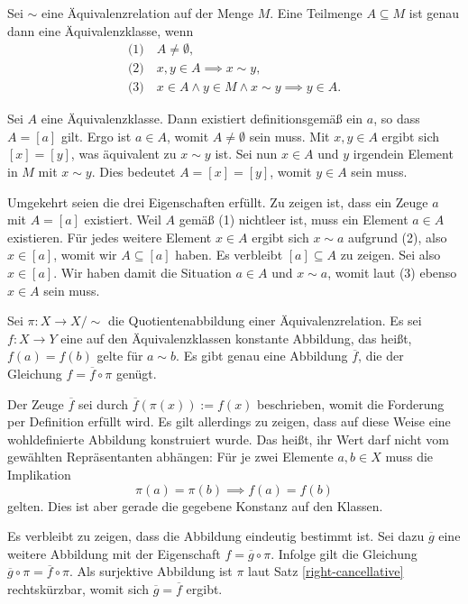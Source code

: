 \begin{Satz}\newlinefirst
Sei $\sim$ eine Äquivalenzrelation auf der Menge $M$. Eine
Teilmenge $A\subseteq M$ ist genau dann eine Äquivalenzklasse, wenn%
\begin{gather*}
\text{(1)}\quad A\ne\emptyset,\\
\text{(2)}\quad x,y\in A\implies x\sim y,\\
\text{(3)}\quad x\in A\land y\in M\land x\sim y\implies y\in A.
\end{gather*}
\end{Satz}
\begin{Beweis}
Sei $A$ eine Äquivalenzklasse. Dann existiert definitionsgemäß
ein $a$, so dass $A=[a]$ gilt. Ergo ist $a\in A$, womit
$A\ne\emptyset$ sein muss. Mit $x,y\in A$ ergibt sich $[x]=[y]$,
was äquivalent zu $x\sim y$ ist. Sei nun $x\in A$ und $y$ irgendein
Element in $M$ mit $x\sim y$. Dies bedeutet $A=[x]=[y]$, womit
$y\in A$ sein muss.

Umgekehrt seien die drei Eigenschaften erfüllt. Zu zeigen ist,
dass ein Zeuge $a$ mit $A=[a]$ existiert. Weil $A$ gemäß (1)
nichtleer ist, muss ein Element $a\in A$ existieren. Für jedes
weitere Element $x\in A$ ergibt sich $x\sim a$ aufgrund (2),
also $x\in [a]$, womit wir $A\subseteq [a]$ haben.
Es verbleibt $[a]\subseteq A$ zu zeigen. Sei also $x\in [a]$.
Wir haben damit die Situation $a\in A$ und $x\sim a$, womit
laut (3) ebenso $x\in A$ sein muss.\,\qedsymbol
\end{Beweis}

\newpage
\begin{Satz}%
\label{quotient-universal-property}\newlinefirst
Sei $\pi\colon X\to X/{\sim}$ die Quotientenabbildung einer
Äquivalenzrelation. Es sei $f\colon X\to Y$ eine auf den
Äquivalenzklassen konstante Abbildung, das heißt, $f(a)=f(b)$ gelte
für $a\sim b$. Es gibt genau eine Abbildung $\overline f$, die der
Gleichung $f=\overline f\circ\pi$ genügt.
\end{Satz}
\begin{Beweis}
Der Zeuge $\overline f$ sei durch $\overline f(\pi(x)):=f(x)$
beschrieben, womit die Forderung
per Definition erfüllt wird. Es gilt allerdings zu zeigen, dass auf
diese Weise eine wohldefinierte Abbildung konstruiert wurde.
Das heißt, ihr Wert darf nicht vom gewählten Repräsentanten abhängen:
Für je zwei Elemente $a,b\in X$ muss die Implikation
\[\pi(a)=\pi(b) \implies f(a) = f(b)\]
gelten. Dies ist aber gerade die gegebene Konstanz auf den Klassen.

Es verbleibt zu zeigen, dass die Abbildung eindeutig bestimmt
ist. Sei dazu $\overline g$ eine weitere Abbildung mit der Eigenschaft
$f=\overline g\circ\pi$. Infolge gilt die Gleichung
$\overline g\circ\pi = \overline f\circ\pi$. Als surjektive Abbildung
ist $\pi$ laut Satz \ref{right-cancellative} rechtskürzbar, womit sich
$\overline g = \overline f$ ergibt.\,\qedsymbol
\end{Beweis}

